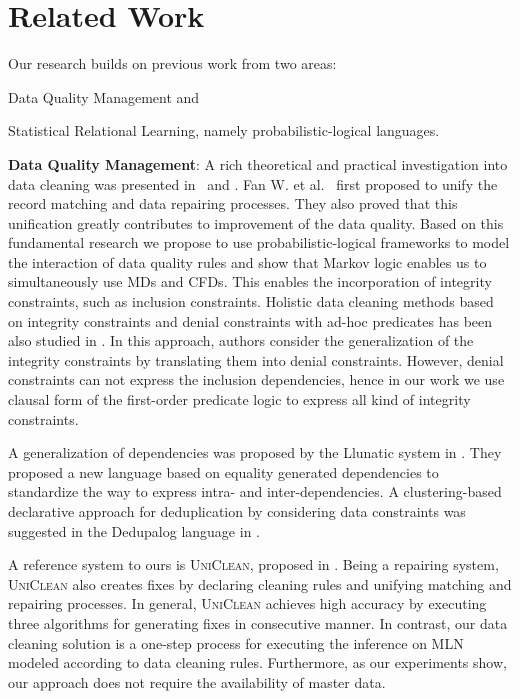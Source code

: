 
\section{Related Work}
\label{sec:related}

Our research builds on previous work from two areas: 
\begin{inparaenum}[\itshape 1\upshape)]
\item Data Quality Management and
\item Statistical Relational Learning, namely probabilistic-logical languages.
\end{inparaenum}

\textbf{Data Quality Management}: A rich theoretical and practical investigation into data cleaning was presented in~\cite{Fan:2014:IRM:2628135.2567657} and \cite{fellegi1976systematic}. Fan W. et al.~\cite{Fan:2011:IRM:1989323.1989373} first proposed to unify the record matching and data repairing processes. They also proved that this unification greatly contributes to improvement of the data quality. Based on this fundamental research we propose to use probabilistic-logical frameworks to model the interaction of data quality rules and show that Markov logic enables us to simultaneously use MDs and CFDs. This enables the incorporation of integrity constraints, such as inclusion constraints. Holistic data cleaning methods based on integrity constraints and denial constraints with ad-hoc predicates has been also studied in \cite{chu2013holistic}. In this approach, authors consider the generalization of the integrity constraints by translating them into denial constraints. However, denial constraints can not express the inclusion dependencies, hence in our work we use clausal form of the first-order predicate logic to express all kind of integrity constraints.

A generalization of dependencies was proposed by the Llunatic system in \cite{llunaticVDLB2013b}. They proposed a new language based on equality generated dependencies to standardize the way to express intra- and inter-dependencies. A clustering-based declarative approach for deduplication by considering data constraints was suggested in the Dedupalog language in \cite{Arasu:2009:LDC:1546683.1547340}.

A reference system to ours is \textsc{UniClean}, proposed in \cite{Fan:2014:IRM:2628135.2567657}. Being a repairing system, \textsc{UniClean} also creates fixes by declaring cleaning rules and unifying matching and repairing processes. In general, \textsc{UniClean} achieves high accuracy by executing three algorithms for generating fixes in consecutive manner. In contrast, our data cleaning solution is a one-step process for executing the inference on MLN modeled according to data cleaning rules. Furthermore, as our experiments show, our approach does not require the availability of master data. 

